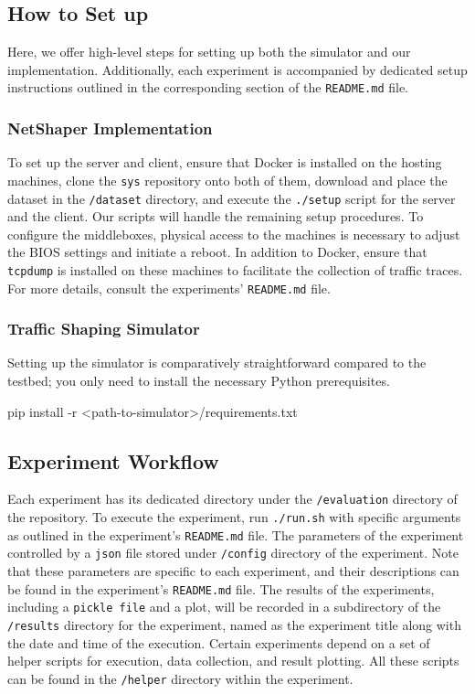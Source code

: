 \subsection{How to Set up}\label{subsec:setup}
Here, we offer high-level steps for setting up both the simulator and our implementation.
Additionally, each experiment is accompanied by dedicated setup instructions outlined in the corresponding section of the \texttt{README.md} file.
\subsubsection{NetShaper Implementation}
\label{subsubsec:setup-testbed}
To set up the server and client, ensure that Docker is installed on the hosting machines, clone the \texttt{sys} repository onto both of them, download and place the dataset in the \texttt{/dataset} directory, and execute the \texttt{./setup} script for the server and the client.
Our scripts will handle the remaining setup procedures.
To configure the middleboxes, physical access to the machines is necessary to adjust the BIOS settings and initiate a reboot. In addition to Docker, ensure that \texttt{tcpdump} is installed on these machines to facilitate the collection of traffic traces. For more details, consult the experiments' \texttt{README.md} file.

\subsubsection{Traffic Shaping Simulator}
\label{subsubsec:setup-simulator}
Setting up the simulator is comparatively straightforward compared to the testbed; you only need to install the necessary Python prerequisites.
\begin{bashcode}
 pip install -r <path-to-simulator>/requirements.txt
\end{bashcode}





\subsection{Experiment Workflow}\label{subsec:work-flow}
Each experiment has its dedicated directory under the \texttt{/evaluation} directory of the {\sys} repository.
To execute the experiment, run \texttt{./run.sh} with specific arguments as outlined in the experiment's \texttt{README.md} file.
The parameters of the experiment controlled by a \texttt{json} file stored under \texttt{/config} directory of the experiment. 
Note that these parameters are specific to each experiment, and their descriptions can be found in the experiment's \texttt{README.md} file. 
The results of the experiments, including a \texttt{pickle file} and a plot, will be recorded in a subdirectory of the \texttt{/results} directory for the experiment, named as the experiment title along with the date and time of the execution.
Certain experiments depend on a set of helper scripts for execution, data collection, and result plotting.
All these scripts can be found in the \texttt{/helper} directory within the experiment.
